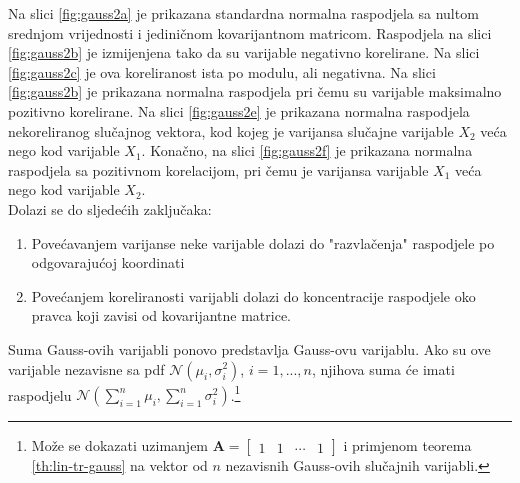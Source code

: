 Na slici \ref{fig:gauss2a} je prikazana standardna normalna raspodjela sa nultom
srednjom vrijednosti i jediničnom kovarijantnom matricom. Raspodjela na slici
\ref{fig:gauss2b} je izmijenjena tako da su varijable negativno korelirane. Na
slici \ref{fig:gauss2c} je ova koreliranost ista po modulu, ali negativna. Na
slici \ref{fig:gauss2b} je prikazana normalna raspodjela pri čemu su varijable
maksimalno pozitivno korelirane. Na slici \ref{fig:gauss2e} je prikazana
normalna raspodjela nekoreliranog slučajnog vektora, kod kojeg je varijansa
slučajne varijable $X_2$ veća nego kod varijable $X_1$. Konačno, na slici
\ref{fig:gauss2f} je prikazana normalna raspodjela sa pozitivnom korelacijom,
pri čemu je varijansa varijable $X_1$ veća nego kod varijable $X_2$.\\

\noindent
Dolazi se do sljedećih zaključaka:
\begin{enumerate}
	\item Povećavanjem varijanse neke varijable dolazi do "razvlačenja" raspodjele
		po odgovarajućoj koordinati
	\item Povećanjem koreliranosti varijabli dolazi do koncentracije raspodjele
		oko pravca koji zavisi od kovarijantne matrice.
\end{enumerate}

\begin{corollary}
  Suma Gauss-ovih varijabli ponovo predstavlja Gauss-ovu varijablu. Ako su ove
  varijable nezavisne sa pdf $\mathcal{N}(\mu_i, \sigma_i^2)$, $i=1,...,n$,
  njihova suma će imati raspodjelu $ \mathcal{N}(\sum_{i=1}^{n}\mu_i,
  \sum_{i=1}^{n}\sigma_i^2)$.\footnote{
    Može se dokazati uzimanjem $\bm A = \left[
        \begin{array}{cccc}
          1 & 1 & \cdots & 1
        \end{array}\right]$
    i primjenom teorema \ref{th:lin-tr-gauss} na vektor od $n$ nezavisnih
    Gauss-ovih slučajnih varijabli.
  }
\end{corollary}

